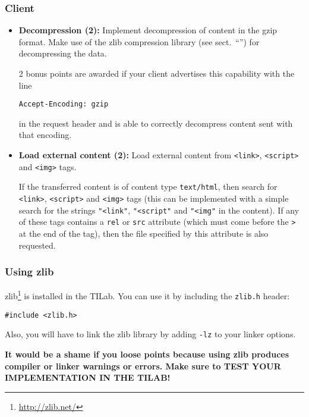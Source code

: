 \subsubsection*{Client}

\begin{itemize}

\item \textbf{Decompression (2):}
Implement decompression of content in the gzip format.
Make use of the zlib compression library (see sect.~``'')
for decompressing the data.

2 bonus points are awarded if your client advertises this capability with the line
\begin{verbatim}
Accept-Encoding: gzip
\end{verbatim}
in the request header and is able to correctly decompress content sent with that encoding.

\item \textbf{Load external content (2):}
Load external content from \texttt{<link>}, \texttt{<script>} and \texttt{<img>} tags.

If the transferred content is of content type \texttt{text/html},
then search for \texttt{<link>}, \texttt{<script>} and \texttt{<img>} tags
(this can be implemented with a simple search
for the strings \verb|"<link"|, \verb|"<script"| and \verb|"<img"| in the content).
If any of these tags contains a \texttt{rel} or \texttt{src} attribute
(which must come before the \texttt{>} at the end of the tag),
then the file specified by this attribute is also requested.

\end{itemize}

\subsubsection*{Using zlib}
\label{sect:zlib}

zlib\footnote{\url{http://zlib.net/}} is installed in the TILab.
You can use it by including the \texttt{zlib.h} header:
\begin{verbatim}
#include <zlib.h>
\end{verbatim}
Also, you will have to link the zlib library by adding \texttt{-lz} to your linker options.

\textbf{It would be a shame if you loose points because using zlib produces
compiler or linker warnings or errors.
Make sure to TEST YOUR IMPLEMENTATION IN THE TILAB!}

\osueguidelinesone


